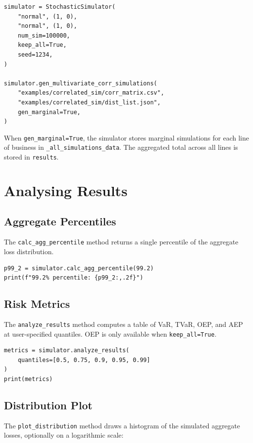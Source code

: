 \begin{lstlisting}[style=pythonstyle]
simulator = StochasticSimulator(
    "normal", (1, 0),
    "normal", (1, 0),
    num_sim=100000,
    keep_all=True,
    seed=1234,
)

simulator.gen_multivariate_corr_simulations(
    "examples/correlated_sim/corr_matrix.csv",
    "examples/correlated_sim/dist_list.json",
    gen_marginal=True,
)
\end{lstlisting}

When \texttt{gen\_marginal=True}, the simulator stores marginal
simulations for each line of business in \texttt{\_all\_simulations\_data}.
The aggregated total across all lines is stored in \texttt{results}.

\section{Analysing Results}

\subsection{Aggregate Percentiles}

The \texttt{calc\_agg\_percentile} method returns a single percentile of
the aggregate loss distribution.

\begin{lstlisting}[style=pythonstyle]
p99_2 = simulator.calc_agg_percentile(99.2)
print(f"99.2% percentile: {p99_2:,.2f}")
\end{lstlisting}

\subsection{Risk Metrics}

The \texttt{analyze\_results} method computes a table of VaR, TVaR, OEP,
and AEP at user-specified quantiles. OEP is only available when
\texttt{keep\_all=True}.

\begin{lstlisting}[style=pythonstyle]
metrics = simulator.analyze_results(
    quantiles=[0.5, 0.75, 0.9, 0.95, 0.99]
)
print(metrics)
\end{lstlisting}

\subsection{Distribution Plot}

The \texttt{plot\_distribution} method draws a histogram of the simulated
aggregate losses, optionally on a logarithmic scale:


